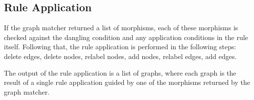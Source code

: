 \subsection{Rule Application}

If the graph matcher returned a list of morphisms, each of these morphisms is checked against the dangling condition and any application conditions in the rule itself. Following that, the rule application is performed in the following steps: delete edges, delete nodes, relabel nodes, add nodes, relabel edges, add edges. 

The output of the rule application is a list of graphs, where each graph is the result of a single rule application guided by one of the morphisms returned by the graph matcher.







